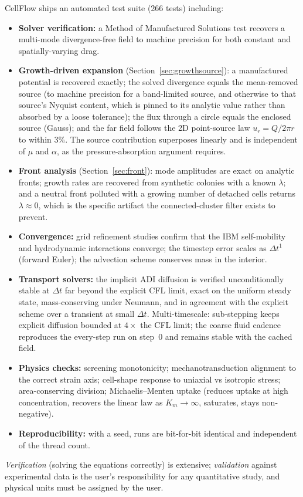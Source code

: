 \documentclass[11pt]{article}
\newcommand{\dt}{\Delta t}
\begin{document}
CellFlow ships an automated test suite (266 tests) including:
\begin{itemize}
  \item \textbf{Solver verification:} a Method of Manufactured Solutions test
        recovers a multi-mode divergence-free field to machine precision for
        both constant and spatially-varying drag.
  \item \textbf{Growth-driven expansion} (Section~\ref{sec:growthsource}): a
        manufactured potential is recovered exactly; the solved divergence equals
        the mean-removed source (to machine precision for a band-limited source,
        and otherwise to that source's Nyquist content, which is pinned to its
        analytic value rather than absorbed by a loose tolerance); the flux
        through a circle equals the enclosed source (Gauss); and the far field
        follows the 2D point-source law $u_r = Q/2\pi r$ to within $3\%$. The
        source contribution superposes linearly and is independent of $\mu$ and
        $\alpha$, as the pressure-absorption argument requires.
  \item \textbf{Front analysis} (Section~\ref{sec:front}): mode amplitudes are
        exact on analytic fronts; growth rates are recovered from synthetic
        colonies with a known $\lambda$; and a neutral front polluted with a
        growing number of detached cells returns $\lambda\approx 0$, which is the
        specific artifact the connected-cluster filter exists to prevent.
  \item \textbf{Convergence:} grid refinement studies confirm that the IBM
        self-mobility and hydrodynamic interactions converge; the timestep error
        scales as $\dt^1$ (forward Euler); the advection scheme conserves mass
        in the interior.
  \item \textbf{Transport solvers:} the implicit ADI diffusion is verified
        unconditionally stable at $\dt$ far beyond the explicit CFL limit, exact
        on the uniform steady state, mass-conserving under Neumann, and in
        agreement with the explicit scheme over a transient at small $\dt$.
        Multi-timescale: sub-stepping keeps explicit diffusion bounded at $4\times$
        the CFL limit; the coarse fluid cadence reproduces the every-step run on
        step~0 and remains stable with the cached field.
  \item \textbf{Physics checks:} screening monotonicity; mechanotransduction
        alignment to the correct strain axis; cell-shape response to uniaxial vs
        isotropic stress; area-conserving division; Michaelis--Menten uptake
        (reduces uptake at high concentration, recovers the linear law as
        $K_m\to\infty$, saturates, stays non-negative).
  \item \textbf{Reproducibility:} with a seed, runs are bit-for-bit identical
        and independent of the thread count.
\end{itemize}
\emph{Verification} (solving the equations correctly) is extensive;
\emph{validation} against experimental data is the user's responsibility for any
quantitative study, and physical units must be assigned by the user.
\end{document}
